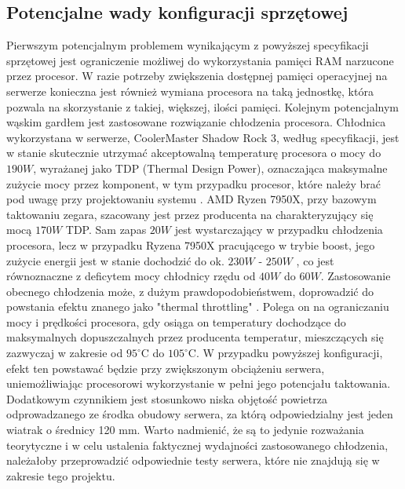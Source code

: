 \subsection{Potencjalne wady konfiguracji sprzętowej}
Pierwszym potencjalnym problemem wynikającym z powyższej specyfikacji sprzętowej jest ograniczenie możliwej do wykorzystania pamięci RAM narzucone przez procesor. W razie potrzeby zwiększenia dostępnej pamięci operacyjnej na serwerze konieczna jest również wymiana procesora na taką jednostkę, która pozwala na skorzystanie z takiej, większej, ilości pamięci. Kolejnym potencjalnym wąskim gardłem jest zastosowane rozwiązanie chłodzenia procesora. Chłodnica wykorzystana w serwerze, CoolerMaster Shadow Rock 3, według specyfikacji, jest w stanie skutecznie utrzymać akceptowalną temperaturę procesora o mocy do $190 W$, wyrażanej jako TDP (Thermal Design Power), oznaczająca maksymalne zużycie mocy przez komponent, w tym przypadku procesor, które należy brać pod uwagę przy projektowaniu systemu \cite{intelTdp}. AMD Ryzen 7950X, przy bazowym taktowaniu zegara, szacowany jest przez producenta na charakteryzujący się mocą $170 W$ TDP. Sam zapas $20W$ jest wystarczający w przypadku chłodzenia procesora, lecz w przypadku Ryzena 7950X pracującego w trybie boost, jego zużycie energii jest w stanie dochodzić do ok. $230 W$ - $250 W$ \cite{amdPpt, testyMocy}, co jest równoznaczne z deficytem mocy chłodnicy rzędu od $40W$ do $60W$. Zastosowanie obecnego chłodzenia może, z dużym prawdopodobieństwem, doprowadzić do powstania efektu znanego jako "thermal throttling" \cite{throttling}. Polega on na ograniczaniu mocy i prędkości procesora, gdy osiąga on temperatury dochodzące do maksymalnych dopuszczalnych przez producenta temperatur, mieszczących się zazwyczaj w zakresie od $95^{\circ}\mathrm{C}$ do $105^{\circ}\mathrm{C}$. W przypadku powyższej konfiguracji, efekt ten powstawać będzie przy zwiększonym obciążeniu serwera, uniemożliwiając procesorowi wykorzystanie w pełni jego potencjału taktowania. Dodatkowym czynnikiem jest stosunkowo niska objętość powietrza odprowadzanego ze środka obudowy serwera, za którą odpowiedzialny jest jeden wiatrak o średnicy 120 mm. Warto nadmienić, że są to jedynie rozważania teorytyczne i w celu ustalenia faktycznej wydajności zastosowanego chłodzenia, należałoby przeprowadzić odpowiednie testy serwera, które nie znajdują się w zakresie tego projektu.

